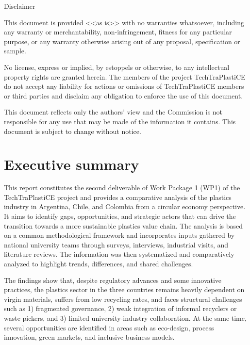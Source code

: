 \documentclass[
  12pt,
  oneside]{book}
\renewcommand*\contentsname{Table of contents}
\newcommand\contentsname{Table of contents}
\begin{document}
\begin{frontmatter}
\begin{titlepage}
{    Disclaimer
    
    This document is provided <<as is>> with no warranties whatsoever, 
    including any warranty or merchantability, non-infringement, fitness for any particular 
    purpose, or any warranty otherwise arising out of any proposal, specification or sample.  
    
    No license, express or implied, by estoppels or otherwise, to any intellectual 
    property rights are granted herein. 
    The members of the project TechTraPlastiCE do not accept any liability for actions or 
    omissions of TechTraPlastiCE members or third parties and disclaim any obligation 
    to enforce the use of this document. 
    
    This document reflects only the authors' view and the Commission is not responsible 
    for any use that may be made of the information it contains.  
    This document is subject to change without notice. 
    
    }
    \normalsize
    
    
    
      \end{titlepage}
  \end{frontmatter}

\renewcommand*\contentsname{Contents}
{
\setcounter{tocdepth}{2}
\tableofcontents
}
\listoffigures
\listoftables

\mainmatter
\chapter*{Executive summary}\label{executive-summary}

This report constitutes the second deliverable of Work Package 1 (WP1)
of the TechTraPlastiCE project and provides a comparative analysis of
the plastics industry in Argentina, Chile, and Colombia from a circular
economy perspective. It aims to identify gaps, opportunities, and
strategic actors that can drive the transition towards a more
sustainable plastics value chain. The analysis is based on a common
methodological framework and incorporates inputs gathered by national
university teams through surveys, interviews, industrial visits, and
literature reviews. The information was then systematized and
comparatively analyzed to highlight trends, differences, and shared
challenges.

The findings show that, despite regulatory advances and some innovative
practices, the plastics sector in the three countries remains heavily
dependent on virgin materials, suffers from low recycling rates, and
faces structural challenges such as 1) fragmented governance, 2) weak
integration of informal recyclers or waste pickers, and 3) limited
university-industry collaboration. At the same time, several
opportunities are identified in areas such as eco-design, process
innovation, green markets, and inclusive business models.
\end{document}
